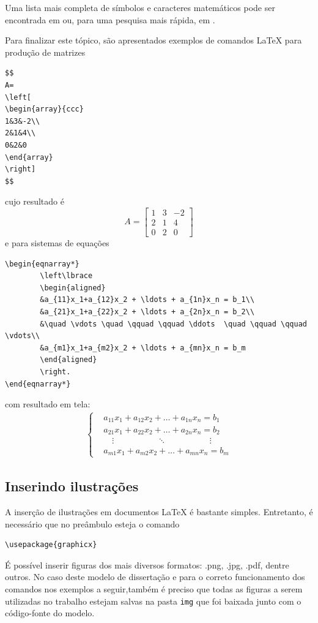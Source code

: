Uma lista mais completa de símbolos e caracteres matemáticos pode ser encontrada em  ou, para uma pesquisa mais rápida, em  .

Para finalizar este tópico, são apresentados exemplos de comandos LaTeX para produção de matrizes
\begin{verbatim}
$$
A=
\left[
\begin{array}{ccc}
1&3&-2\\
2&1&4\\
0&2&0
\end{array}
\right]
$$
\end{verbatim}
cujo resultado é
$$
A=
\left[
\begin{array}{ccc}
1&3&-2\\
2&1&4\\
0&2&0
\end{array}
\right]
$$
e para sistemas de equações
\begin{verbatim}
\begin{eqnarray*}
		\left\lbrace
		\begin{aligned}
		&a_{11}x_1+a_{12}x_2 + \ldots + a_{1n}x_n = b_1\\
		&a_{21}x_1+a_{22}x_2 + \ldots + a_{2n}x_n = b_2\\
		&\quad \vdots \quad \qquad \qquad \ddots  \quad \qquad \qquad \vdots\\
		&a_{m1}x_1+a_{m2}x_2 + \ldots + a_{mn}x_n = b_m
		\end{aligned}
		\right.
\end{eqnarray*}
\end{verbatim}
com resultado em tela:
\begin{eqnarray*}
		\left\lbrace
		\begin{aligned}
		&a_{11}x_1+a_{12}x_2 + \ldots + a_{1n}x_n = b_1\\
		&a_{21}x_1+a_{22}x_2 + \ldots + a_{2n}x_n = b_2\\
		&\quad \vdots \quad \qquad \qquad \ddots  \quad \qquad \qquad \vdots\\
		&a_{m1}x_1+a_{m2}x_2 + \ldots + a_{mn}x_n = b_m
		\end{aligned}
		\right.
\end{eqnarray*}

\subsection{Inserindo ilustrações}

A inserção de ilustrações em documentos LaTeX é bastante simples. Entretanto, é necessário que no preâmbulo esteja o comando
\begin{verbatim}
\usepackage{graphicx}
\end{verbatim}
É possível inserir figuras dos mais diversos formatos: .png, .jpg, .pdf, dentre outros. No caso deste modelo de dissertação e para o correto funcionamento dos comandos nos exemplos a seguir,também é preciso que todas as figuras a serem utilizadas no trabalho estejam salvas na pasta \verb!img! que foi baixada junto com o código-fonte do modelo.

